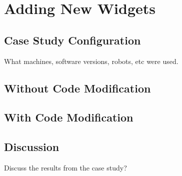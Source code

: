 \section{Adding New Widgets}

\subsection{Case Study Configuration}
What machines, software versions, robots, etc were used.

\subsection{Without Code Modification}
\subsection{With Code Modification}
\subsection{Discussion}
Discuss the results from the case study?
